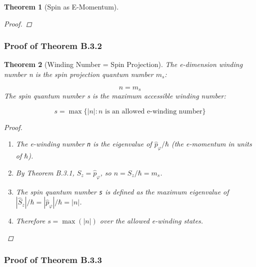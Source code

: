 \documentclass[aps,prd,preprint,superscriptaddress,longbibliography,floatfix]{revtex4-2}
\newtheorem{theorem}{Theorem}[section]
\theoremstyle{remark}
\begin{document}
\begin{theorem}[Spin as E-Momentum]
\begin{proof}
\end{proof}
\end{theorem}

\subsubsection{Proof of Theorem B.3.2}

\begin{theorem}[Winding Number = Spin Projection]
\label{thm:B32} \textit{The e-dimension winding number n is the spin projection quantum number $m_s$:}


\begin{equation}
    n = m_s
\end{equation}
\textit{The spin quantum number s is the maximum accessible winding number:}


\begin{equation}
    s = \max\{|n| : n \text{ is an allowed e-winding number}\}
\end{equation}
\begin{proof}


\begin{enumerate}
  \item The e-winding number \texttt{n} is the eigenvalue of $\hat{p}_\varphi/\hbar$ (the e-momentum in units of $\hbar$).
  \item By Theorem B.3.1, $\hat{S}_z = \hat{p}_\varphi$, so $n = S_z/\hbar = m_s$.
  \item The spin quantum number \texttt{s} is defined as the maximum eigenvalue of $|\hat{S}_z|/\hbar = |\hat{p}_\varphi|/\hbar = |n|$.
  \item Therefore $s = \max(|n|)$ over the allowed e-winding states.
\end{enumerate}

\end{proof}
\end{theorem}

\subsubsection{Proof of Theorem B.3.3}
\end{document}
